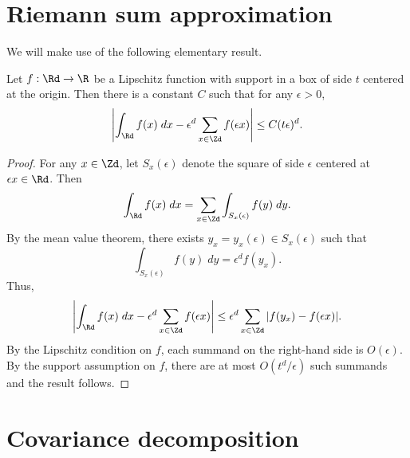 
\section{Riemann sum approximation}

We will make use of the following elementary result.

\begin{lemma}
Let $f : \Rd \to \R$ be a Lipschitz function with support in a box of side $t$
centered at the origin.
Then there is a constant $C$ such that for any $\epsilon > 0$,
\begin{equation}
\left|\int_\Rd f(x) \; dx - \epsilon^d \sum_{x\in\Zd} f(\epsilon x)\right|
	\le
C (t \epsilon)^d.
\end{equation}
\end{lemma}

\begin{proof}
For any $x\in\Zd$, let $S_x(\epsilon)$ denote the square of side $\epsilon$
centered at $\epsilon x\in\Rd$. Then
\begin{equation}
\int_{\Rd} f(x) \; dx
	=
\sum_{x\in\Zd} \int_{S_x(\epsilon)} f(y) \; dy.
\end{equation}
By the mean value theorem, there exists $y_x = y_x(\epsilon) \in S_x(\epsilon)$ such that
\begin{equation}
\int_{S_x(\epsilon)} f(y) \; dy
	=
\epsilon^d f(y_x).
\end{equation}
Thus,
\begin{equation}
\left|\int_\Rd f(x) \; dx - \epsilon^d \sum_{x\in\Zd} f(\epsilon x)\right|
	\le
\epsilon^d \sum_{x\in\Zd} |f(y_x) - f(\epsilon x)|.
\end{equation}
By the Lipschitz condition on $f$, each summand on the right-hand side is
$O(\epsilon)$. By the support assumption on $f$, there are at most
$O(t^d/\epsilon)$ such summands and the result follows.
\end{proof}


\section{Covariance decomposition}

